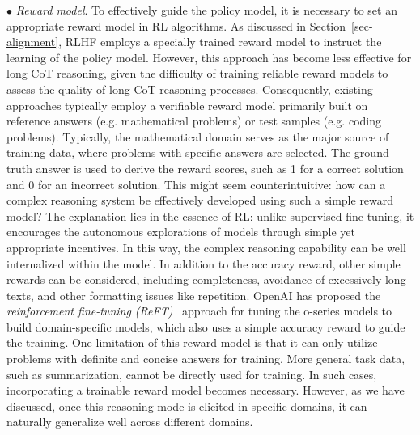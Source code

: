 $\bullet$ \emph{ Reward model}. To effectively guide the policy model, it is necessary to set an appropriate reward model in RL algorithms. As discussed in Section~\ref{sec-alignment}, RLHF employs a specially trained reward model to instruct the learning of the policy model. However, this approach has become less effective for long CoT reasoning, given the difficulty of training reliable reward models to assess the quality of long CoT reasoning processes. Consequently, existing approaches typically employ a verifiable reward model primarily built on reference answers (e.g. mathematical problems) or test samples (e.g. coding problems). Typically, the mathematical domain serves as the major source of training data, where problems with specific answers are selected. The ground-truth answer is used to derive the reward scores, such as 1 for a correct solution and 0 for an incorrect solution. This might seem counterintuitive: how can a complex reasoning system be effectively developed using such a simple reward model? The explanation lies in the essence of RL: unlike supervised fine-tuning, it encourages the autonomous explorations of models through simple yet appropriate incentives. In this way, the complex reasoning capability can be well internalized within the model. In addition to the accuracy reward, other simple rewards can be considered, including completeness, avoidance of excessively long texts, and other formatting issues like repetition. OpenAI has proposed the \emph{reinforcement fine-tuning (ReFT)}~\cite{OpenAI-openai-2024-Reinforcement} approach for tuning the o-series models to build domain-specific models, which also uses a simple accuracy reward to guide the training. One limitation of this reward model is that it can only utilize problems with definite and concise answers for training. More general task data, such as summarization, cannot be directly used for training. In such cases, incorporating a trainable reward model becomes necessary. However, as we have discussed, once this reasoning mode is elicited in specific domains, it can naturally generalize well across different domains.

